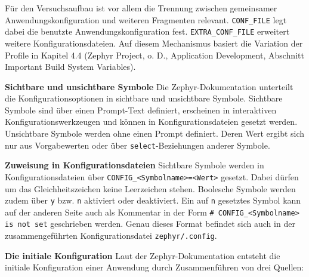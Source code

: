 F{\"u}r den Versuchsaufbau ist vor allem die Trennung zwischen gemeinsamer Anwendungskonfiguration und weiteren Fragmenten relevant. \lstinline[style=fileinline]|CONF_FILE| legt dabei die benutzte Anwendungskonfiguration fest. \lstinline[style=fileinline]|EXTRA_CONF_FILE| erweitert weitere Konfigurationsdateien. Auf diesem Mechanismus basiert die Variation der Profile in Kapitel 4.4 (Zephyr Project, o. D., \glqq{}Application Development\grqq{}, Abschnitt \glqq{}Important Build System Variables\grqq{}).

\textbf{Sichtbare und unsichtbare Symbole} Die Zephyr-Dokumentation unterteilt die Konfigurationsoptionen in \glqq{}sichtbare\grqq{} und \glqq{}unsichtbare\grqq{} Symbole. Sichtbare Symbole sind {\"u}ber einen Prompt-Text definiert, erscheinen in interaktiven Konfigurationswerkzeugen und k{\"o}nnen in Konfigurationsdateien gesetzt werden. Unsichtbare Symbole werden ohne einen Prompt definiert. Deren Wert ergibt sich nur aus Vorgabewerten oder {\"u}ber \lstinline[style=fileinline]|select|-Beziehungen anderer Symbole.

\textbf{Zuweisung in Konfigurationsdateien} Sichtbare Symbole werden in Konfigurationsdateien {\"u}ber \lstinline[style=fileinline]|CONFIG_<Symbolname>=<Wert>| gesetzt. Dabei d{\"u}rfen um das Gleichheitszeichen keine Leerzeichen stehen. Boolesche Symbole werden zudem {\"u}ber \lstinline[style=fileinline]|y| bzw. \lstinline[style=fileinline]|n| aktiviert oder deaktiviert. Ein auf \lstinline[style=fileinline]|n| gesetztes Symbol kann auf der anderen Seite auch als Kommentar in der Form \lstinline[style=fileinline]|# CONFIG_<Symbolname> is not set| geschrieben werden. Genau dieses Format befindet sich auch in der zusammengef{\"u}hrten Konfigurationsdatei \lstinline[style=fileinline]|zephyr/.config|.

\textbf{Die initiale Konfiguration} Laut der Zephyr-Dokumentation entsteht die initiale Konfiguration einer Anwendung durch Zusammenf{\"u}hren von drei Quellen:

